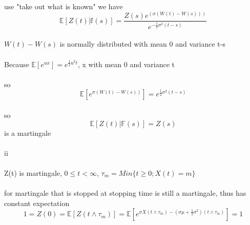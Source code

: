 \documentclass{article}
\begin{document}
\paragraph{}{use "take out what is known" we have \begin{displaymath}
                                                    \mathbb{E}[Z(t)|\mathbb{f}(s)]=\frac{Z(s)e^{(\sigma(W(t)-W(s)))}}{e^{-\frac{1}{2}\sigma^2(t-s)}}
                                                  \end{displaymath}}
\paragraph{}{$W(t)-W(s)$ is normally distributed with mean 0 and variance t-s}
\paragraph{}{Because $\mathbb{E}[e^{ux}]=e^{\frac{1}{2}u^{2}t}$, x with mean 0 and variance t}
\paragraph{}{so \begin{displaymath}
                  \mathbb{E}[e^{\sigma(W(t)-W(s))}]=e^{\frac{1}{2}\sigma^{2}(t-s)}
                \end{displaymath}}
\paragraph{}{so \begin{displaymath}
                  \mathbb{E}[Z(t)|\mathbb{F}(s)]=Z(s)
                \end{displaymath} is a martingale}
\paragraph{}{ii}
\paragraph{}{Z(t) is martingale, $ 0 \le t < \infty $, $\tau_{m}=Min\{t\ge 0; X(t)=m\}$}
\paragraph{}{for martingale that is stopped at stopping time is still a martingale, thus has constant expectation}
\begin{displaymath}
  1=Z(0)=\mathbb{E}[Z(t\land \tau_{m})]=\mathbb{E}[e^{\sigma X (t\land \tau_{m})-(\sigma\mu + \frac{1}{2}\sigma^2)(t\land \tau_{m})}]=1
\end{displaymath}
\end{document}
